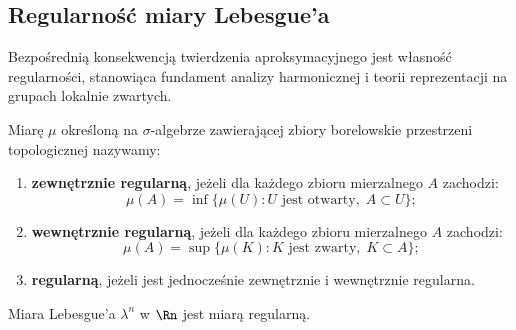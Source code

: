 \subsection{Regularność miary Lebesgue'a}

Bezpośrednią konsekwencją twierdzenia aproksymacyjnego jest własność regularności, stanowiąca fundament analizy harmonicznej i teorii reprezentacji na grupach lokalnie zwartych.

\begin{defi}
    Miarę $\mu$ określoną na $\sigma$-algebrze zawierającej zbiory borelowskie przestrzeni topologicznej nazywamy:
    \begin{enumerate}
        \item \textbf{zewnętrznie regularną}, jeżeli dla każdego zbioru mierzalnego $A$ zachodzi:
              \begin{equation*}
                  \mu(A) = \inf \{\mu(U) \colon U \text{ jest otwarty}, \; A \subset U\};
              \end{equation*}
        \item \textbf{wewnętrznie regularną}, jeżeli dla każdego zbioru mierzalnego $A$ zachodzi:
              \begin{equation*}
                  \mu(A) = \sup \{\mu(K) \colon K \text{ jest zwarty}, \; K \subset A\};
              \end{equation*}
        \item \textbf{regularną}, jeżeli jest jednocześnie zewnętrznie i wewnętrznie regularna.
    \end{enumerate}
\end{defi}

\begin{tw}
    Miara Lebesgue'a $\lambda^n$ w $\Rn$ jest miarą regularną.
\end{tw}

